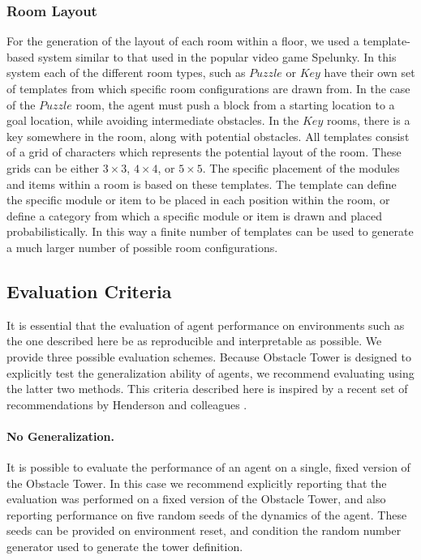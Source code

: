 \documentclass{article}
\begin{document}
\subsubsection{Room Layout} For the generation of the layout of each room within a floor, we used a template-based system similar to that used in the popular video game Spelunky. In this system each of the different room types, such as $Puzzle$ or $Key$ have their own set of templates from which specific room configurations are drawn from. In the case of the $Puzzle$ room, the agent must push a block from a starting location to a goal location, while avoiding intermediate obstacles. In the $Key$ rooms, there is a key somewhere in the room, along with potential obstacles. All templates consist of a grid of characters which represents the potential layout of the room. These grids can be either $3\times3$, $4\times4$, or $5\times5$. The specific placement of the modules and items within a room is based on these templates. The template can define the specific module or item to be placed in each position within the room, or define a category from which a specific module or item is drawn and placed probabilistically. In this way a finite number of templates can be used to generate a much larger number of possible room configurations. 

\subsection{Evaluation Criteria} 

It is essential that the evaluation of agent performance on environments such as the one described here be as reproducible and interpretable as possible. We provide three possible evaluation schemes. Because Obstacle Tower is designed to explicitly test the generalization ability of agents, we recommend evaluating using the latter two methods. This criteria described here is inspired by a recent set of recommendations by Henderson and colleagues \cite{henderson2017deep}. 

\paragraph{No Generalization.} It is possible to evaluate the performance of an agent on a single, fixed version of the Obstacle Tower. In this case we recommend explicitly reporting that the evaluation was performed on a fixed version of the Obstacle Tower, and also reporting performance on five random seeds of the dynamics of the agent. These seeds can be provided on environment reset, and condition the random number generator used to generate the tower definition.
\end{document}
